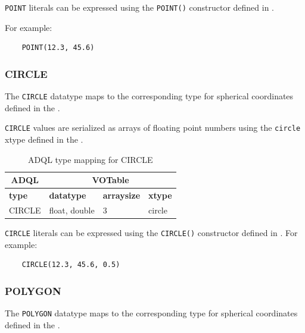 \documentclass[11pt,a4paper]{ivoa}
\begin{document}
\verb:POINT: literals can be expressed using the \verb:POINT():
constructor defined in .

For example:
\begin{verbatim}
    POINT(12.3, 45.6)
\end{verbatim}

\subsubsection{CIRCLE}
\label{sec:types.geom.circle}

The \verb:CIRCLE: datatype maps to the corresponding type
for spherical coordinates defined in the
\DALISpec{}.

\verb:CIRCLE: values are serialized as arrays of floating point numbers
using the \verb:circle: xtype defined in the \DALISpec{}.

\begin{table}[h]\footnotesize
    \begin{tabular}
        {|p{}|p{}|p{}|p{}|}

        \hline
        \multicolumn{1}{|c|}{\textbf{ADQL}} &
        \multicolumn{3}{|c|}{\textbf{VOTable}}
        \tabularnewline

        \hline
        \textbf{type} &
        \textbf{datatype} &
        \textbf{arraysize} &
        \textbf{xtype}
        \tabularnewline

        \hline
        CIRCLE &
        float, double &
        3 &
        circle
        \tabularnewline
        \hline
    \end{tabular}
    \caption{ADQL type mapping for CIRCLE}
    \label{table:types.geom.circle}
\end{table}

\verb:CIRCLE: literals can be expressed using the \verb:CIRCLE():
constructor defined in .
For example:
\begin{verbatim}
    CIRCLE(12.3, 45.6, 0.5)
\end{verbatim}

\subsubsection{POLYGON}
\label{sec:types.geom.polygon}

The \verb:POLYGON: datatype maps to the corresponding type
for spherical coordinates defined in the
\DALISpec{}.
\end{document}
